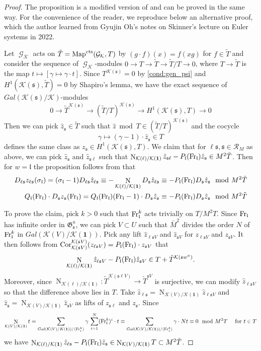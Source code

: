 \documentclass[leqno]{amsart}
\theoremstyle{definition}
\theoremstyle{remark}
\newcommand{\id}{\mathbf{1}}
\DeclareMathOperator{\Nr}{N}
\DeclareMathOperator{\Cor}{Cor}
\DeclareMathOperator{\Gal}{\mathcal{G}}
\newcommand{\Fr}{\textnormal{Fr}} %
\newcommand{\cts}{\textnormal{cts}}
\newcommand{\fl}{\mathfrak{l}}
\newcommand{\fs}{\mathfrak{s}}
\newcommand{\K}{{\mathcal{K}}} %
\newcommand{\fG}{\mathfrak{G}}
\begin{document}
\begin{proof}

The proposition is a modified version of 
\cite[Thm 4.5.4]{Rubin} and can be proved in the same way.
For the convenience of the reader,
we reproduce below an alternative proof,
which the author learned from Gyujin Oh's notes on 
Skinner's lecture on Euler systems in 2022.

Let $\Gal_\K$ acts on $\tilde{T}=\text{Map}^{\cts}(\Gal_\K,T)$
by $(g\cdot f)(x)=f(xg)$ for $f\in \tilde{T}$
and consider the sequence of $\Gal_\K$-modules
$0\to T\to \tilde{T}\to \tilde{T}/T\to 0$,
where $T\to \tilde{T}$ is the map
$t\mapsto [\gamma\mapsto \gamma\cdot t]$.
Since $T^{\K(\fs)}=0$ by \eqref{cond:gen_psi}
and $H^1(\K(\fs),\tilde{T})=0$ by
Shapiro's lemma, we have the exact sequence of $Gal(\K(\fs)/\K)$-modules
\[
	0\to\tilde{T}^{\K(\fs)}\to (\tilde{T}/T)^{\K(\fs)}\to 
	H^1(\K(\fs),T)\to 0
\]
Then we can pick
$\hat{z}_\fs\in \tilde{T}$ such that
$\hat{z}\bmod T\in (\tilde{T}/T)^{\K(\fs)}$ and the cocycle
\[
    \gamma\mapsto (\gamma-1)\cdot \hat{z}_\fs\in T
\]
defines the same class as $z_\fs\in H^1(\K(\fs),T)$.
We claim that for $\ell\fs, \fs\in\mathcal{R}_M$ as above,
we can pick $\hat{z}_\fs$ and $\hat{z}_{\fs\ell}$ such that 
$\Nr_{\K(\ell)/\K(\id)}\hat{z}_{\fs\ell}-P_\fl(\Fr_\fl)
\hat{z}_{\fs}\in M^2\tilde{T}$.
Then for $w=\fl$ the proposition follows from that
\begin{align*}
	D_{\ell\fs}z_{\ell\fs}(\sigma_\fl)=
	(\sigma_\fl-1)D_{\ell\fs}\hat{z}_{\ell\fs}
	\equiv-\Nr_{\K(\ell)/\K(\id)}D_\fs \hat{z}_{\ell\fs}
	&\equiv-P_\fl(\Fr_{\fl}) D_\fs \hat{z}_\fs \mod M^2\tilde{T}\\
	Q_\fl(\Fr_\fl)\cdot
	D_\fs z_\fs(\Fr_\fl)=
	Q_\fl(\Fr_{\fl})(\Fr_{\fl}-1)
	\cdot D_\fs \hat{z}_\fs
	&\equiv-P_\fl(\Fr_{\fl}) D_\fs \hat{z}_\fs \mod M^2\tilde{T}
\end{align*}

To prove the claim,
pick $k>0$ such that 
$\Fr_\fl^k$ acts trivially on $T/{M^2}T$.
Since $\Fr_\fl$ has infinite order in $\fG_{\fs}^a$,
we can pick $V\subset U$ such that $\bar{M}^2$ divides
the order $N$ of $\Fr_\fl^k$ in $Gal(\K(V)/\K(\id))$.
Pick any lift 
$\hat{z}_{\ell\fs V}$ and  $\hat{z}_{\fs V}$  for
$z_{\ell\fs V}$ and  $z_{\fs V}$.
It then follows from 
$\Cor_{\K(\fs V)}^{\K(\fs V)}(z_{\ell\fs V})=
P_\fl(\Fr_\fl)\cdot z_{\fs V}$ that
\[
	\Nr_{\K(\ell)/\K(\id)}
	\hat{z}_{\ell\fs V}-P_\fl(\Fr_\fl)
	\hat{z}_{\fs V}\in T+\tilde{T}^{\K(\fs w^a)}.
\]
Moreover, since
$\Nr_{\K(\ell)/\K(\id)}\colon\tilde{T}^{\K(\fs\ell V)}\to
\tilde{T}^{\fs V}$ is surjective,
we can modify $\hat{z}_{\ell\fs V}$ so that the difference
above lies in $T$.
Take $\hat{z}_{\ell\fs}=\Nr_{\K(V)/\K(\id)}
\hat{z}_{\ell\fs V}$ and
$\hat{z}_{\fs}=\Nr_{\K(V)/\K(\id)}\hat{z}_{\fs V}$
as lifts of $z_{\fs\ell}$ and $z_{\fs}$.
Since
\[
	\Nr_{\K(V)/\K(\id)}t=
	\sum_{Gal(\K(V)/K(\id))/\langle \Fr_\fl^k\rangle}\gamma\,
	\sum_{i=1}^{N}(\Fr_\fl^k)^i\cdot  t \equiv
	\sum_{Gal(\K(V)/\K(\id))/\langle \Fr_\fl^k\rangle}\gamma\cdot
    Nt\equiv 0
	\mod M^2T\quad
	\text{ for } t\in T
\]
we have 
$\Nr_{\K(\ell)/\K(\id)}\hat{z}_{\ell\fs}-P_\fl(\Fr_\fl)
\hat{z}_{\fs}\in \Nr_{\K(V)/\K(\id)}T\subset M^2\tilde{T}$.
\end{proof}
\end{document}

